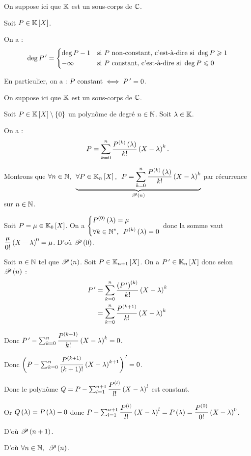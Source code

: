 \begin{prop}
On suppose ici que \(\K\) est un sous-corps de \(\C\).

Soit \(P\in\poly\).

On a : \[\deg P\prim=\begin{dcases}\deg P-1&\text{si }P\text{ non-constant, \cad si }\deg P\geq1 \\ \minf&\text{si }P\text{ constant, \cad si }\deg P\leq0\end{dcases}\]

En particulier, on a : \(P\text{ constant}\ssi P\prim=0\).
\end{prop}

\begin{prop}\label{prop:TaylorPoly}
On suppose ici que \(\K\) est un sous-corps de \(\C\).

Soit \(P\in\poly\excluant\accol{0}\) un polynôme de degré \(n\in\N\). Soit \(\lambda\in\K\).

On a : \[P=\sum_{k=0}^{n}\dfrac{P\deriv{k}\paren{\lambda}}{k!}\paren{X-\lambda}^k.\]
\end{prop}

\begin{dem}
Montrons que \(\quantifs{\forall n\in\N}\underbrace{\quantifs{\forall P\in\poly[\K_n]}P=\sum_{k=0}^{n}\dfrac{P\deriv{k}\paren{\lambda}}{k!}\paren{X-\lambda}^k}_{\P{n}}\) par récurrence sur \(n\in\N\).

Soit \(P=\mu\in\poly[\K_0]\). On a \(\begin{dcases}P\deriv{0}\paren{\lambda}=\mu \\ \quantifs{\forall k\in\Ns}P\deriv{k}\paren{\lambda}=0\end{dcases}\) donc la somme vaut \(\dfrac{\mu}{0!}\paren{X-\lambda}^0=\mu\). D'où \(\P{0}\).

Soit \(n\in\N\) tel que \(\P{n}\). Soit \(P\in\poly[\K_{n+1}]\). On a \(P\prim\in\poly[\K_n]\) donc selon \(\P{n}\) : \[\begin{aligned}
P\prim&=\sum_{k=0}^{n}\dfrac{\paren{P\prim}\deriv{k}}{k!}\paren{X-\lambda}^k \\
&=\sum_{k=0}^{n}\dfrac{P\deriv{k+1}}{k!}\paren{X-\lambda}^k
\end{aligned}\]

Donc \(P\prim-\sum_{k=0}^{n}\dfrac{P\deriv{k+1}}{k!}\paren{X-\lambda}^k=0\).

Donc \(\paren{P-\sum_{k=0}^{n}\dfrac{P\deriv{k+1}}{\paren{k+1}!}\paren{X-\lambda}^{k+1}}\prim=0\).

Donc le polynôme \(Q=P-\sum_{l=1}^{n+1}\dfrac{P\deriv{l}}{l!}\paren{X-\lambda}^l\) est constant.

Or \(Q\paren{\lambda}=P\paren{\lambda}-0\) donc \(P-\sum_{l=1}^{n+1}\dfrac{P\deriv{l}}{l!}\paren{X-\lambda}^l=P\paren{\lambda}=\dfrac{P\deriv{0}}{0!}\paren{X-\lambda}^0\).

D'où \(\P{n+1}\).

D'où \(\quantifs{\forall n\in\N}\P{n}\).
\end{dem}

